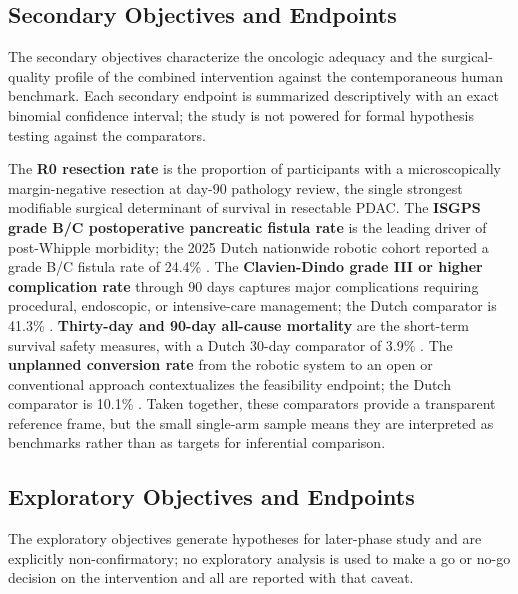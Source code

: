 \subsection{Secondary Objectives and Endpoints}

The secondary objectives characterize the oncologic adequacy and the
surgical-quality profile of the combined intervention against the contemporaneous
human benchmark. Each secondary endpoint is summarized descriptively with an
exact binomial confidence interval; the study is not powered for formal hypothesis
testing against the comparators.

The \textbf{R0 resection rate} is the proportion of participants with a
microscopically margin-negative resection at day-90 pathology review, the single
strongest modifiable surgical determinant of survival in resectable PDAC. The
\textbf{ISGPS grade B/C postoperative pancreatic fistula rate} \cite{Bassi2017}
is the leading driver of post-Whipple morbidity; the 2025 Dutch nationwide
robotic cohort reported a grade B/C fistula rate of 24.4\% \cite{DutchCohort2025}.
The \textbf{Clavien-Dindo grade III or higher complication rate} through 90 days
captures major complications requiring procedural, endoscopic, or intensive-care
management; the Dutch comparator is 41.3\% \cite{DutchCohort2025}.
\textbf{Thirty-day and 90-day all-cause mortality} are the short-term survival
safety measures, with a Dutch 30-day comparator of 3.9\% \cite{DutchCohort2025}.
The \textbf{unplanned conversion rate} from the robotic system to an open or
conventional approach contextualizes the feasibility endpoint; the Dutch
comparator is 10.1\% \cite{DutchCohort2025}. Taken together, these comparators
provide a transparent reference frame, but the small single-arm sample means they
are interpreted as benchmarks rather than as targets for inferential comparison.

\subsection{Exploratory Objectives and Endpoints}

The exploratory objectives generate hypotheses for later-phase study and are
explicitly non-confirmatory; no exploratory analysis is used to make a
go or no-go decision on the intervention and all are reported with that caveat.

